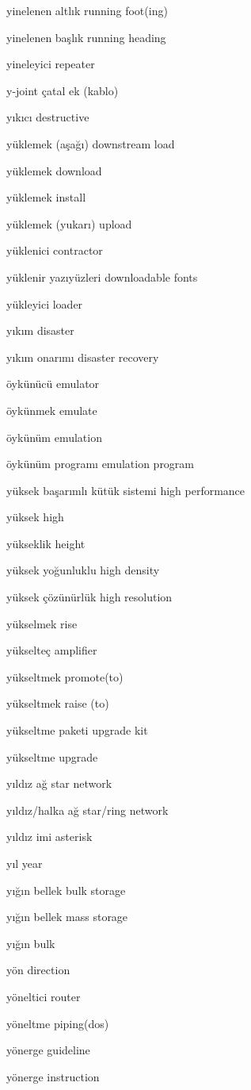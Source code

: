 \documentclass[12pt,fleqn]{article}\usepackage{../../common}
\begin{document}
yinelenen altlık running foot(ing)

yinelenen başlık running heading

yineleyici repeater

y-joint çatal ek (kablo)

yıkıcı destructive

yüklemek (aşağı) downstream load

yüklemek download

yüklemek install

yüklemek (yukarı) upload

yüklenici contractor

yüklenir yazıyüzleri downloadable fonts

yükleyici loader

yıkım disaster

yıkım onarımı disaster recovery

öykünücü emulator

öykünmek emulate

öykünüm emulation

öykünüm programı emulation program

yüksek başarımlı kütük sistemi high performance

yüksek high

yükseklik height

yüksek yoğunluklu high density

yüksek çözünürlük high resolution

yükselmek rise

yükselteç amplifier

yükseltmek promote(to)

yükseltmek raise (to)

yükseltme paketi upgrade kit

yükseltme upgrade

yıldız ağ star network

yıldız/halka ağ star/ring network

yıldız imi asterisk

yıl year

yığın bellek bulk storage

yığın bellek mass storage

yığın bulk

yön direction

yöneltici router

yöneltme piping(dos)

yönerge guideline

yönerge instruction
\end{document}
